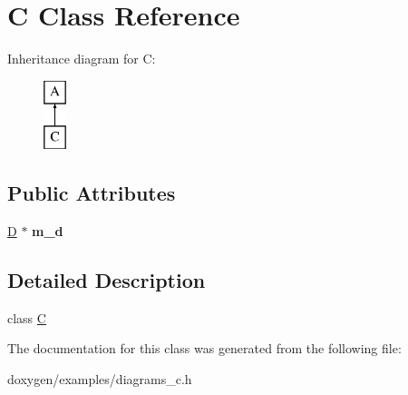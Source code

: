 \hypertarget{class_c}{}\section{C Class Reference}
\label{class_c}
Inheritance diagram for C\+:\begin{figure}[H]
\begin{center}
\leavevmode
\includegraphics[height=2.000000cm]{class_c}
\end{center}
\end{figure}
\subsection*{Public Attributes}
\begin{DoxyCompactItemize}
\item 
\mbox{\label{class_c_a4ef972d28b73ff78eba3ab4f54c3b449}} 
\mbox{\hyperlink{class_d}{D}} $\ast$ {\bfseries m\+\_\+d}
\end{DoxyCompactItemize}


\subsection{Detailed Description}
class \mbox{\hyperlink{class_c}{C}} 

The documentation for this class was generated from the following file\+:\begin{DoxyCompactItemize}
\item 
doxygen/examples/diagrams\+\_\+c.\+h\end{DoxyCompactItemize}
